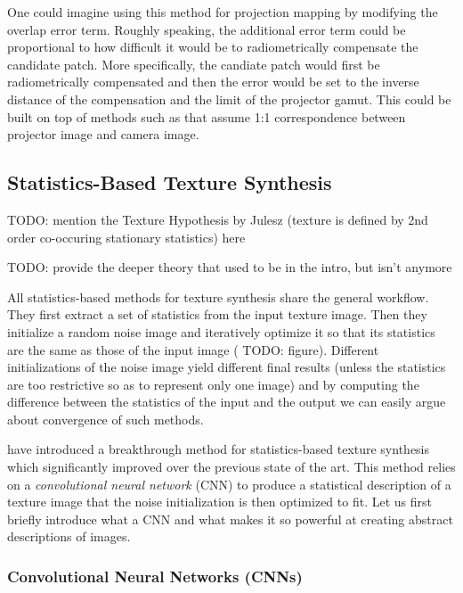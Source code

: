 One could imagine using this method for projection mapping by modifying the overlap error term. Roughly speaking, the additional error term could be proportional to how difficult it would be to radiometrically compensate the candidate patch. More specifically, the candiate patch would first be radiometrically compensated and then the error would be set to the inverse distance of the compensation and the limit of the projector gamut. This could be built on top of methods such as \citet{Grundhofer2015} that assume 1:1 correspondence between projector image and camera image.

\subsection{Statistics-Based Texture Synthesis}
\label{section:background-texture_synthesis-statistics_based}

{\color{red} TODO: mention the Texture Hypothesis by Julesz (texture is defined by 2nd order co-occuring stationary statistics) here}

{\color{red} TODO: provide the deeper theory that used to be in the intro, but isn't anymore}

All statistics-based methods for texture synthesis share the general workflow. They first extract a set of statistics from the input texture image. Then they initialize a random noise image and iteratively optimize it so that its statistics are the same as those of the input image ({\color{red} TODO: figure}). Different initializations of the noise image yield different final results (unless the statistics are too restrictive so as to represent only one image) and by computing the difference between the statistics of the input and the output we can easily argue about convergence of such methods.

\citet{Gatys2015} have introduced a breakthrough method for statistics-based texture synthesis which significantly improved over the previous state of the art. This method relies on a \textit{convolutional neural network} (CNN) to produce a statistical description of a texture image that the noise initialization is then optimized to fit. Let us first briefly introduce what a CNN and what makes it so powerful at creating abstract descriptions of images.

\subsubsection{Convolutional Neural Networks (CNNs)}
\label{section:background-texture_synthesis-statistics_based-cnns}

